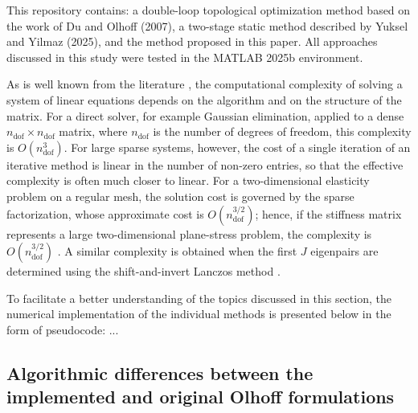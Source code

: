 \documentclass[pdflatex,lineno,sn-mathphys-ay]{sn-jnl}
\begin{document}
This repository contains: a double-loop topological optimization method based on the work of Du and Olhoff (2007), a two-stage static method described by Yuksel and Yilmaz (2025), and the method proposed in this paper. All approaches discussed in this study were tested in the MATLAB 2025b environment.

As is well known from the literature \citep{George1973,Davis2006}, the computational complexity of solving a system of linear equations depends on the algorithm and on the structure of the matrix. For a direct solver, for example Gaussian elimination, applied to a dense $n_\mathrm{dof} \times n_\mathrm{dof}$ matrix, where $n_\mathrm{dof}$ is the number of degrees of freedom, this complexity is $O(n_\mathrm{dof}^3)$. For large sparse systems, however, the cost of a single iteration of an iterative method is linear in the number of non-zero entries, so that the effective complexity is often much closer to linear. For a two-dimensional elasticity problem on a regular mesh, the solution cost is governed by the sparse factorization, whose approximate cost is $O(n_\mathrm{dof}^{3/2})$; hence, if the stiffness matrix represents a large two-dimensional plane-stress problem, the complexity is $O(n_\mathrm{dof}^{3/2})$ \citep{George1973,Davis2006}. A similar complexity is obtained when the first $J$ eigenpairs are determined using the shift-and-invert Lanczos method \citep{Saad2011}.

To facilitate a better understanding of the topics discussed in this section, the numerical implementation of the individual methods is presented below in the form of pseudocode:
...


%

\subsection{Algorithmic differences between the implemented and original Olhoff formulations}\label{subsec:olhoffImpl}
\end{document}
